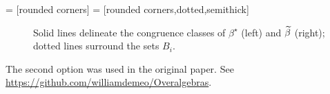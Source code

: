 \documentclass{amsart}
\begin{document}
     = [rounded corners]
     = [rounded corners,dotted,semithick]

    \renewcommand{\mycaption}{Solid lines delineate the congruence classes
      of $\beta^\star$ (left) and $\tbeta$ (right); dotted lines surround the sets $B_i$.}

\begin{figure}[h]
  \centering
      {
        \hskip1cm
      }
      \caption{\mycaption}
\end{figure}

\noindent 
The second option was used in the original paper. See \\
\url{https://github.com/williamdemeo/Overalgebras}.
\end{document}
